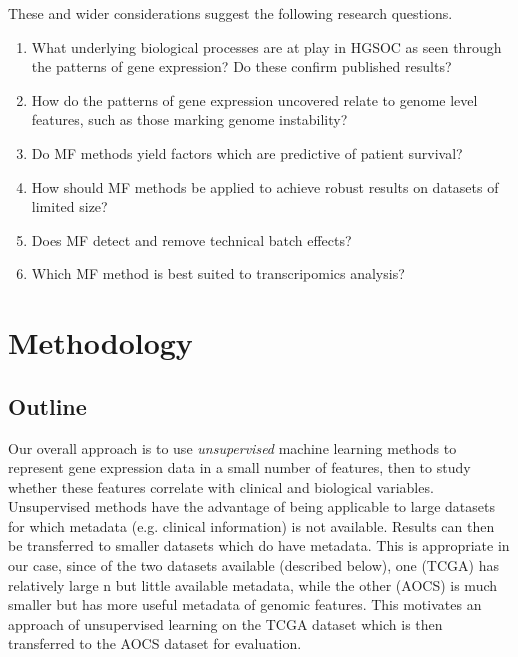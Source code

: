 \documentclass[tikz, 12pt,a4paper,oneside,fleqn]{article}
\begin{document}
These and wider considerations suggest the following research questions.

\begin{enumerate}
\item What underlying biological processes are at play in HGSOC as seen through the patterns of gene expression?  Do these confirm published results?
\item How do the patterns of gene expression uncovered relate to genome level features, such as those marking genome instability?
\item Do MF methods yield factors which are predictive of patient survival?
\item How should MF methods be applied to achieve robust results on datasets of limited size?
\item Does MF detect and remove technical batch effects?
\item Which MF method is best suited to transcripomics analysis?
\end{enumerate}



\section{Methodology}

\subsection{Outline}

Our overall approach is to use \emph{unsupervised} machine learning methods to represent gene expression data in a small number of features, then to study whether these features correlate with clinical and biological variables.  Unsupervised methods have the advantage of being applicable to large datasets for which metadata (e.g. clinical information) is not available.  Results can then be transferred to smaller datasets which do have metadata.   This is appropriate in our case, since of the two datasets available (described below), one (TCGA) has relatively large n but little available metadata, while the other (AOCS) is much smaller but has more useful metadata of genomic features.   This motivates an approach of unsupervised learning on the TCGA dataset which is then transferred to the AOCS dataset for evaluation.
\end{document}
